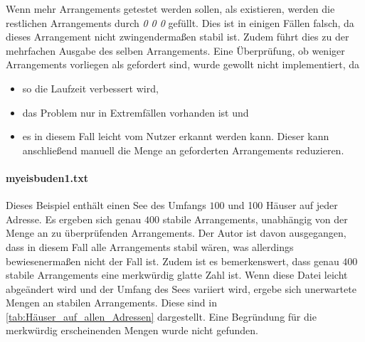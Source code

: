 \documentclass[a4paper,10pt,ngerman,captions=figureheading]{scrartcl}
\begin{document}
Wenn mehr Arrangements getestet werden sollen, als existieren, werden die restlichen Arrangements durch \emph{0 0 0} gefüllt.
Dies ist in einigen Fällen falsch, da dieses Arrangement nicht zwingendermaßen stabil ist.
Zudem führt dies zu der mehrfachen Ausgabe des selben Arrangements.
Eine Überprüfung, ob weniger Arrangements vorliegen als gefordert sind, wurde gewollt nicht implementiert, da
\begin{itemize}
    \item so die Laufzeit verbessert wird,
    \item das Problem nur in Extremfällen vorhanden ist und
    \item es in diesem Fall leicht vom Nutzer erkannt werden kann.
          Dieser kann anschließend manuell die Menge an geforderten Arrangements reduzieren.
\end{itemize}

\paragraph{myeisbuden1.txt}
Dieses Beispiel enthält einen See des Umfangs $100$ und 100 Häuser auf jeder Adresse.
Es ergeben sich genau $400$ stabile Arrangements, unabhängig von der Menge an zu überprüfenden Arrangements.
Der Autor ist davon ausgegangen, dass in diesem Fall alle Arrangements stabil wären, was allerdings bewiesenermaßen nicht der Fall ist.
Zudem ist es bemerkenswert, dass genau $400$ stabile Arrangements eine merkwürdig \glqq glatte\grqq{} Zahl ist.
Wenn diese Datei leicht abgeändert wird und der Umfang des Sees variiert wird, ergebe sich unerwartete Mengen an stabilen Arrangements.
Diese sind in \autoref{tab:Häuser_auf_allen_Adressen} dargestellt.
Eine Begründung für die merkwürdig erscheinenden Mengen wurde nicht gefunden.
\end{document}
